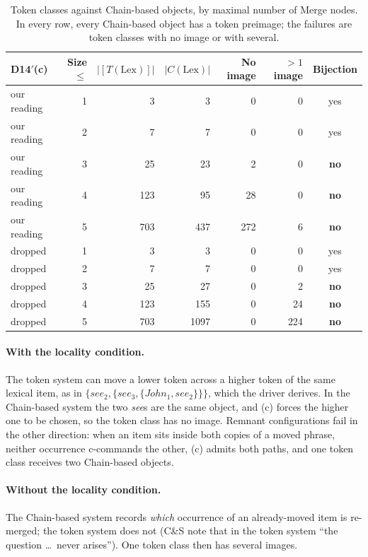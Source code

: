 \documentclass[11pt]{article}
\newcommand{\pf}[1]{\textit{#1}}
\newcommand{\Def}[1]{D#1}
\theoremstyle{definition}
\theoremstyle{plain}
\begin{document}
\begin{table}[t]
\centering
\small
\begin{tabular}{@{}lrrrrrc@{}}
\toprule
\Def{14}$'$(c) & Size $\le$ & $|[T(\mathrm{Lex})]|$ & $|C(\mathrm{Lex})|$ & No image & $>1$ image & Bijection \\
\midrule
our reading & 1 &   3 &    3 &   0 &   0 & yes \\
our reading & 2 &   7 &    7 &   0 &   0 & yes \\
our reading & 3 &  25 &   23 &   2 &   0 & \textbf{no} \\
our reading & 4 & 123 &   95 &  28 &   0 & \textbf{no} \\
our reading & 5 & 703 &  437 & 272 &   6 & \textbf{no} \\
\midrule
dropped     & 1 &   3 &    3 &   0 &   0 & yes \\
dropped     & 2 &   7 &    7 &   0 &   0 & yes \\
dropped     & 3 &  25 &   27 &   0 &   2 & \textbf{no} \\
dropped     & 4 & 123 &  155 &   0 &  24 & \textbf{no} \\
dropped     & 5 & 703 & 1097 &   0 & 224 & \textbf{no} \\
\bottomrule
\end{tabular}
\caption{Token classes against Chain-based objects, by maximal number of
Merge nodes. In every row, every Chain-based object has a token preimage; the
failures are token classes with no image or with several.}
\label{tab:t4}
\end{table}

\paragraph{With the locality condition.}
The token system can move a lower token across a higher token of the same
lexical item, as in $\{\mathit{see}_2,\{\mathit{see}_3,\{\mathit{John}_1,
\mathit{see}_2\}\}\}$, which the driver derives. In the Chain-based system
the two \pf{see}s are the same object, and (c) forces the higher one to be
chosen, so the token class has no image. Remnant configurations fail in the
other direction: when an item sits inside both copies of a moved phrase,
neither occurrence c-commands the other, (c) admits both paths, and one token
class receives two Chain-based objects.

\paragraph{Without the locality condition.}
The Chain-based system records \emph{which} occurrence of an already-moved
item is re-merged; the token system does not (C\&S note that in the token
system ``the question \dots\ never arises''). One token class then has several
images.
\end{document}
